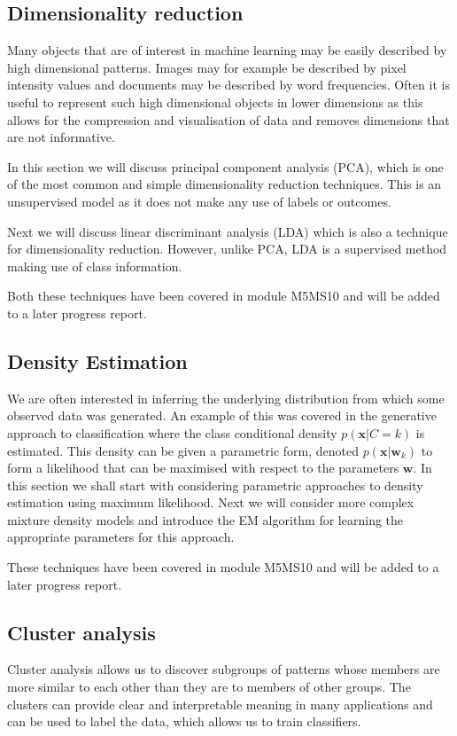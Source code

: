 \documentclass[english]{article}
\begin{document}
\subsection{Dimensionality reduction}
Many objects that are of interest in machine learning may be easily described by high dimensional patterns. Images may for example be described by pixel intensity values and documents may be described by word frequencies. Often it is useful to represent such high dimensional objects in lower dimensions as this allows for the compression and visualisation of data and removes dimensions that are not informative.

In this section we will discuss principal component analysis (PCA), which is one of the most common and simple dimensionality reduction techniques. This is an unsupervised model as it does not make any use of labels or outcomes.

Next we will discuss linear discriminant analysis (LDA) which is also a technique for dimensionality reduction. However, unlike PCA, LDA is a supervised method making use of class information. 

Both these techniques have been covered in module M5MS10 and will be added to a later progress report.
\subsection{Density Estimation}
We are often interested in inferring the underlying distribution from which some observed data was generated. An example of this was covered in the generative approach to classification where the class conditional density $p(\textbf{x}|C=k)$ is estimated. This density can be given a parametric form, denoted $p(\textbf{x}|\textbf{w}_k)$ to form a likelihood that can be maximised with respect to the parameters $\textbf{w}$. In this section we shall start with considering parametric approaches to density estimation using maximum likelihood. Next we will consider more complex mixture density models and introduce the EM algorithm for learning the appropriate parameters for this approach.

These techniques have been covered in module M5MS10 and will be added to a later progress report.
\subsection{Cluster analysis}
Cluster analysis allows us to discover subgroups of patterns whose members are more similar to each other than they are to members of other groups. The clusters can provide clear and interpretable meaning in many applications and can be used to label the data, which allows us to train classifiers. 
\end{document}
